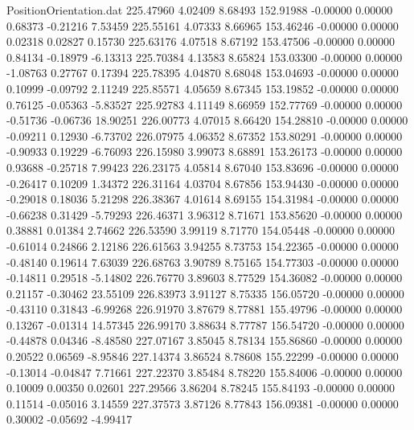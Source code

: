 \begin{filecontents}{PositionOrientation.dat}
 225.47960    4.02409    8.68493   152.91988   -0.00000    0.00000    0.68373   -0.21216    7.53459
 225.55161    4.07333    8.66965   153.46246   -0.00000    0.00000    0.02318    0.02827    0.15730
 225.63176    4.07518    8.67192   153.47506   -0.00000    0.00000    0.84134   -0.18979   -6.13313
 225.70384    4.13583    8.65824   153.03300   -0.00000    0.00000   -1.08763    0.27767    0.17394
 225.78395    4.04870    8.68048   153.04693   -0.00000    0.00000    0.10999   -0.09792    2.11249
 225.85571    4.05659    8.67345   153.19852   -0.00000    0.00000    0.76125   -0.05363   -5.83527
 225.92783    4.11149    8.66959   152.77769   -0.00000    0.00000   -0.51736   -0.06736   18.90251
 226.00773    4.07015    8.66420   154.28810   -0.00000    0.00000   -0.09211    0.12930   -6.73702
 226.07975    4.06352    8.67352   153.80291   -0.00000    0.00000   -0.90933    0.19229   -6.76093
 226.15980    3.99073    8.68891   153.26173   -0.00000    0.00000    0.93688   -0.25718    7.99423
 226.23175    4.05814    8.67040   153.83696   -0.00000    0.00000   -0.26417    0.10209    1.34372
 226.31164    4.03704    8.67856   153.94430   -0.00000    0.00000   -0.29018    0.18036    5.21298
 226.38367    4.01614    8.69155   154.31984   -0.00000    0.00000   -0.66238    0.31429   -5.79293
 226.46371    3.96312    8.71671   153.85620   -0.00000    0.00000    0.38881    0.01384    2.74662
 226.53590    3.99119    8.71770   154.05448   -0.00000    0.00000   -0.61014    0.24866    2.12186
 226.61563    3.94255    8.73753   154.22365   -0.00000    0.00000   -0.48140    0.19614    7.63039
 226.68763    3.90789    8.75165   154.77303   -0.00000    0.00000   -0.14811    0.29518   -5.14802
 226.76770    3.89603    8.77529   154.36082   -0.00000    0.00000    0.21157   -0.30462   23.55109
 226.83973    3.91127    8.75335   156.05720   -0.00000    0.00000   -0.43110    0.31843   -6.99268
 226.91970    3.87679    8.77881   155.49796   -0.00000    0.00000    0.13267   -0.01314   14.57345
 226.99170    3.88634    8.77787   156.54720   -0.00000    0.00000   -0.44878    0.04346   -8.48580
 227.07167    3.85045    8.78134   155.86860   -0.00000    0.00000    0.20522    0.06569   -8.95846
 227.14374    3.86524    8.78608   155.22299   -0.00000    0.00000   -0.13014   -0.04847    7.71661
 227.22370    3.85484    8.78220   155.84006   -0.00000    0.00000    0.10009    0.00350    0.02601
 227.29566    3.86204    8.78245   155.84193   -0.00000    0.00000    0.11514   -0.05016    3.14559
 227.37573    3.87126    8.77843   156.09381   -0.00000    0.00000    0.30002   -0.05692   -4.99417

\end{filecontents}
